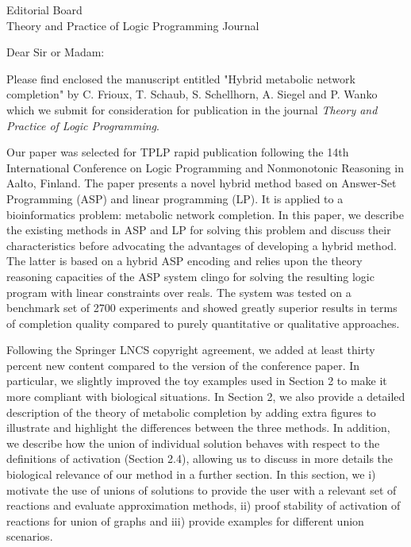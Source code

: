 \documentclass{letter}
\begin{document}
\begin{letter}{Editorial Board \\ Theory and Practice of Logic Programming Journal}
\opening{Dear Sir or Madam:}

Please find enclosed the manuscript entitled "Hybrid metabolic network completion" by C. Frioux, T. Schaub, S. Schellhorn, A. Siegel and P. Wanko 
which we submit for consideration for publication in the journal \emph{Theory and Practice of Logic Programming}.

Our paper was selected for TPLP rapid publication following the 14th International Conference on Logic Programming and Nonmonotonic Reasoning in Aalto, Finland. 
The paper presents a novel hybrid method based on Answer-Set Programming (ASP) and linear programming (LP). 
It is applied to a bioinformatics problem: metabolic network completion. 
In this paper, we describe the existing methods in ASP and LP for solving this problem and discuss their characteristics before advocating the advantages of developing a hybrid method. 
The latter is based on a hybrid ASP encoding and relies upon the theory reasoning capacities of the ASP system clingo for solving the resulting logic program with linear constraints over reals. 
The system was tested on a benchmark set of 2700 experiments and showed greatly superior results in terms of completion quality compared to purely quantitative or qualitative approaches.

Following the Springer LNCS copyright agreement, we added at least thirty percent new content compared to the version of the conference paper.
In particular, we slightly improved the toy examples used in Section 2 to make it more compliant with biological situations. 
In Section 2, we also provide a detailed description of the theory of metabolic completion by adding extra figures to illustrate and highlight the differences between the three methods. 
In addition, we describe how the union of individual solution behaves with respect to the definitions of activation (Section 2.4), 
allowing us to discuss in more details the biological relevance of our method in a further section.
In this section, we i) motivate the use of unions of solutions to provide the user with a relevant set of reactions and evaluate approximation methods, ii) proof stability of activation of reactions for union of graphs and iii) provide examples for different union scenarios.


\end{letter}
\end{document}
